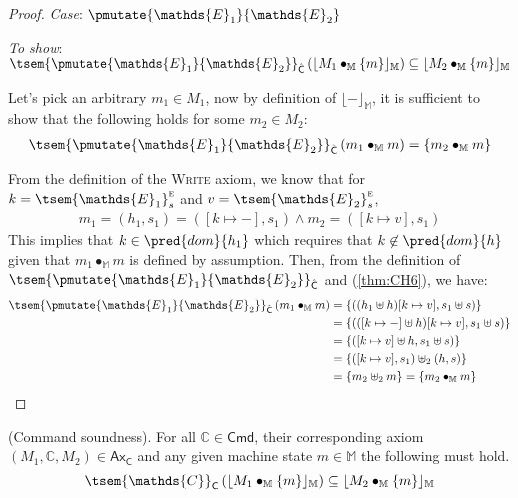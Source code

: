 {\begin{proof}
\textit{Case}: $\pmutate{\mathds{E}_1}{\mathds{E}_2}$

\textit{To show}: $\tsem{\pmutate{\mathds{E}_1}{\mathds{E}_2}}_{\hat{\mathsf{C}}} \left( \lfloor M_1 \bullet_\mathbb{M} \{m\} \rfloor_\mathbb{M} \right) \subseteq \lfloor M_2 \bullet_\mathbb{M} \{m\} \rfloor_\mathbb{M}$

Let's pick an arbitrary $m_1 \in M_1$, now by definition of $\lfloor - \rfloor_\mathbb{M}$, it is sufficient to show that the following holds for some $m_2 \in M_2$:
\begin{gather}
	\label{thm:CH5} \tsem{\pmutate{\mathds{E}_1}{\mathds{E}_2}}_{\hat{\mathsf{C}}} \left( m_1 \bullet_\mathbb{M} m \right) = \{ m_2 \bullet_\mathbb{M} m \}
\end{gather}

From the definition of the \textsc{Write} axiom, we know that for $k = \tsem{\mathds{E}_1}_s^\textsc{e}$ and $v = \tsem{\mathds{E}_2}_s^\textsc{e}$,
\begin{gather}
	\label{thm:CH6}
	m_1 = (h_1, s_1) = ([k \mapsto -], s_1) \land m_2 = ([k \mapsto v], s_1)
\end{gather}
This implies that $k \in \pred{dom}{h_1}$ which requires that $k \not\in \pred{dom}{h}$ given that $m_1 \bullet_\mathbb{M} m$ is defined by assumption. Then, from the definition of $\tsem{\pmutate{\mathds{E}_1}{\mathds{E}_2}}_{\hat{\mathsf{C}}}$ and (\ref{thm:CH6}), we have:
\begin{align*}
	\tsem{\pmutate{\mathds{E}_1}{\mathds{E}_2}}_{\hat{\mathsf{C}}} \left( m_1 \bullet_\mathbb{M} m \right)
		&=
	\{((h_1 \uplus h)[k \mapsto v], s_1 \uplus s)\} \\
		&=
	\{(([k \mapsto -] \uplus h)[k \mapsto v], s_1 \uplus s)\} \\
		&=
	\{([k \mapsto v] \uplus h, s_1 \uplus s)\} \\
		&=
	\{ ([k \mapsto v], s_1) \uplus_2 (h, s) \} \\
		&=
	\{ m_2 \uplus_2 m \} = \{ m_2 \bullet_\mathbb{M} m \}
\end{align*}
\end{proof}
}

\thm \label{thm:cSound} (Command soundness). For all $\mathds{C} \in \mathsf{Cmd}$, their corresponding axiom $(M_1, \mathds{C}, M_2) \in \mathsf{Ax}_\mathsf{C}$ and any given machine state $m \in \mathbb{M}$ the following must hold.
\[
	\tsem{\mathds{C}}_\mathsf{C} \left( \lfloor M_1 \bullet_\mathbb{M} \{m\} \rfloor_\mathbb{M} \right) \subseteq \lfloor M_2 \bullet_\mathbb{M} \{m\} \rfloor_\mathbb{M}
\]

